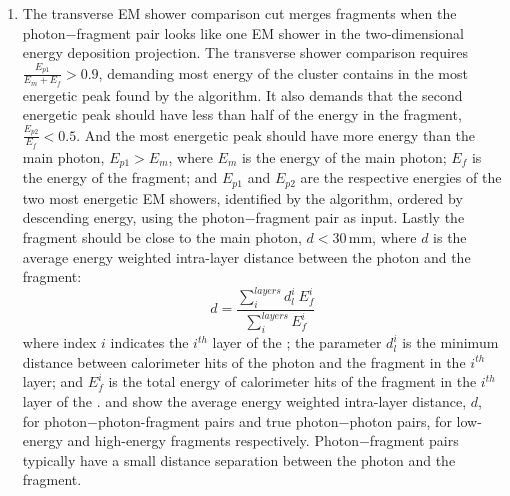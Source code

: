 \begin{enumerate}
  \item The transverse EM shower comparison cut merges fragments when the photon$-$fragment pair looks like one EM shower in the two-dimensional energy deposition projection. The transverse shower comparison requires $\frac{E_{p1}}{E_m + E_f} > 0.9 $, demanding  most energy of the cluster contains in the most energetic peak found by the  \peakFinding algorithm. It also demands that the second energetic peak should have less than half of the energy in the fragment,  $\frac{E_{p2}}{E_f} < 0.5 $. And the most energetic peak should have more energy than the main photon,   $E_{p1} > E_m$, where $E_m$ is the energy of the main photon;  $E_f$ is  the energy of the fragment; and $E_{p1}$ and $E_{p2}$ are the respective energies of the two most energetic EM showers,  identified by the \peakFinding algorithm, ordered by descending energy, using the photon$-$fragment pair as input. Lastly the fragment should be close to the main photon, $d < 30 $\,mm, where $d$ is the average energy weighted intra-layer distance between the photon and the fragment:
\begin{equation}
d = \frac{\sum_{i}^{layers}d_l^i \ E_{f}^i}{\sum_{i}^{layers}E_{f}^i}
\end{equation}
where index $i$ indicates the $i^{th}$ layer of the \ECAL; the parameter $d_{l}^i$ is the minimum distance between calorimeter hits of the photon and the fragment in the $i^{th}$ layer; and $E_{f}^i$ is the total energy of calorimeter hits of the fragment in the $i^{th}$ layer of the \ECAL.    and  show the average energy weighted intra-layer distance, $d$, for  photon$-$photon-fragment pairs and true photon$-$photon pairs, for low-energy and high-energy fragments respectively. Photon$-$fragment pairs typically have a small distance separation between the photon and the fragment.

\end{enumerate}
